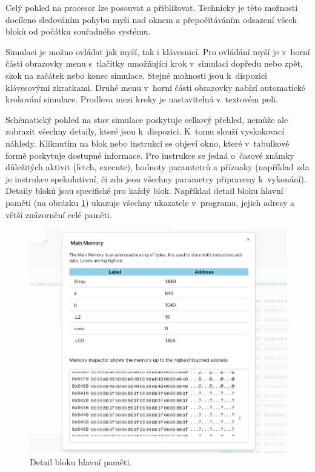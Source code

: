 Celý pohled na procesor lze posouvat a přibližovat.
Technicky je této možnosti docíleno sledováním pohybu myši nad oknem a přepočítáváním odsazení všech bloků od počátku souřadného systému.

Simulaci je možno ovládat jak myší, tak i klávesnicí.
Pro ovládání myší je v~horní části obrazovky menu s~tlačítky umožňující krok v~simulaci dopředu nebo zpět, skok na začátek nebo konec simulace.
Stejné možnosti jsou k~dispozici klávesovými zkratkami.
Druhé menu v~horní části obrazovky nabízí automatické krokování simulace.
Prodleva mezi kroky je nastavitelná v~textovém poli.

Schématický pohled na stav simulace poskytuje celkový přehled, nemůže ale zobrazit všechny detaily, které jsou k~dispozici.
K~tomu slouží vyskakovací náhledy.
Kliknutím na blok nebo instrukci se objeví okno, které v~tabulkové formě poskytuje dostupné informace.
Pro instrukce se jedná o~časové známky důležitých aktivit (fetch, execute), hodnoty paramtetrů a příznaky (například zda je instrukce spekulativní, či zda jsou všechny parametry připraveny k~vykonání).
Detaily bloků jsou specifické pro každý blok.
Například detail bloku hlavní paměti (na obrázku \ref{mainmemory_popup_figure}) ukazuje všechny ukazatele v~programu, jejich adresy a větší znázornění celé paměti.

\begin{figure}[hbtp]
    \begin{center}
        \includegraphics[width=12cm]{obrazky-figures/impl/mainmemory_popup.png}
    \end{center}
    \caption{Detail bloku hlavní paměti.}
    \label{mainmemory_popup_figure}
\end{figure}


